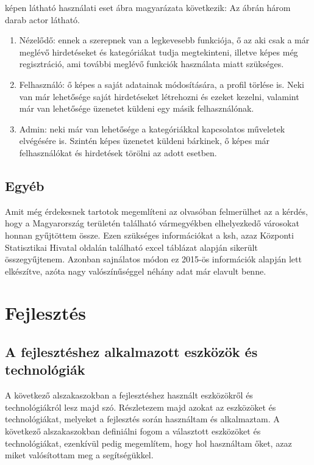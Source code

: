 \documentclass[]{thesis-ekf}
\theoremstyle{definition}
\theoremstyle{remark}
\begin{document}
	 képen látható használati eset ábra magyarázata következik:
	Az ábrán három darab actor látható.
	\begin{enumerate}
		\item Nézelődő: ennek a szerepnek van a legkevesebb funkciója, ő az aki csak a már meglévő hirdetéseket és kategóriákat tudja megtekinteni, illetve képes még regisztráció, ami további meglévő funkciók használata miatt szükséges.
		\item Felhasználó: ő képes a saját adatainak módosítására, a profil törlése is. Neki van már lehetősége saját hirdetéseket létrehozni és ezeket kezelni, valamint már van lehetősége üzenetet küldeni egy másik felhasználónak.
		\item Admin: neki már van lehetősége a kategóriákkal kapcsolatos műveletek elvégésére is. Szintén képes üzenetet küldeni bárkinek, ő képes már felhasználókat és hirdetések törölni az adott esetben.
	\end{enumerate}	
	
	\section{Egyéb}
		Amit még érdekesnek tartotok megemlíteni az olvasóban felmerülhet az a kérdés, hogy a Magyarország területén található vármegyékben elhelyezkedő városokat honnan gyűjtöttem össze. Ezen szükséges információkat a ksh, azaz Központi Statisztikai Hivatal oldalán található excel táblázat alapján sikerült összegyűjtenem. Azonban sajnálatos módon ez 2015-ös információk alapján lett elkészítve, azóta nagy valószínűséggel néhány adat már elavult benne. 

	\chapter{Fejlesztés}		
	\section{A fejlesztéshez alkalmazott eszközök és technológiák}
		A következő alszakaszokban a fejlesztéshez használt eszközökről és technológiákról lesz majd szó. Részletezem majd azokat az eszközöket és technológiákat, melyeket a fejlesztés során használtam és alkalmaztam. A következő alszakaszokban definiálni fogom a választott eszközöket és technológiákat, ezenkívül pedig megemlítem, hogy hol használtam őket, azaz miket valósítottam meg a segítségükkel.
\end{document}
